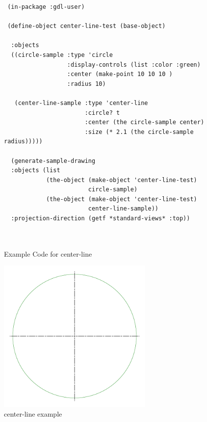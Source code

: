 \documentclass [11pt]{book}
\begin{document}
\begin{itemize}
\begin{figure}
\begin{lrbox}{\boxedverb}
\begin{minipage}{\linewidth}
{\begin{verbatim}
 (in-package :gdl-user)

 (define-object center-line-test (base-object)
 
  :objects 
  ((circle-sample :type 'circle
                  :display-controls (list :color :green)
                  :center (make-point 10 10 10 )
                  :radius 10)
   
   (center-line-sample :type 'center-line
                       :circle? t
                       :center (the circle-sample center)
                       :size (* 2.1 (the circle-sample radius)))))

  (generate-sample-drawing 
  :objects (list 
            (the-object (make-object 'center-line-test) 
                        circle-sample) 
            (the-object (make-object 'center-line-test) 
                        center-line-sample))
  :projection-direction (getf *standard-views* :top))
 
 
\end{verbatim}}
\end{minipage}
\end{lrbox}
\fbox{\usebox{\boxedverb}}

\caption{Example Code for center-line}

\label{fig:example-code-center-line}

\end{figure}

\begin{figure}
\begin{center}
\includegraphics[width=3in,height=3in]{../images/example-center-line.pdf}
\end{center}

\caption{center-line example}

\label{fig:center-line}


\end{figure}
\end{itemize}
\end{document}

